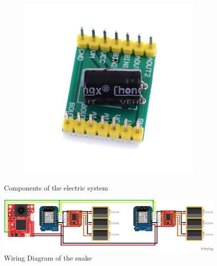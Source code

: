 \documentclass[twoside]{article}
\begin{document}
\begin{figure}[H]
\begin{subfigure}[b]{0.33\linewidth}
	\end{subfigure}%
	\begin{subfigure}[b]{0.33\linewidth}
		\centering
		\includegraphics[width=\textwidth]{A4950}
	\end{subfigure}
	\caption{Components of the electric system}
\end{figure}

\begin{figure} [H]
	\centering
	\includegraphics[width=\linewidth]{wiring_diagram}
	\caption{Wiring Diagram of the snake}
\end{figure}
\end{document}
